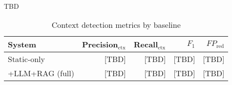 TBD



\begin{table}[htbp]
	\centering
		\caption{Context detection metrics by baseline}\label{tab:context-metrics}
	\begin{tabular}{lrrrr}
		\hline
		System & Precision$_{\text{ctx}}$ & Recall$_{\text{ctx}}$ & $F_1$ & $FP_{\text{red}}$ \\
		\hline
		Static-only & [TBD] & [TBD] & [TBD] & [TBD] \\
		+LLM+RAG (full) & [TBD] & [TBD] & [TBD] & [TBD] \\
		\hline
	\end{tabular}
\end{table}




